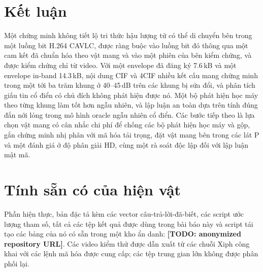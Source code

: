 \documentclass[journal]{IEEEtran}
\newcommand{\todo}[1]{\textbf{[TODO: #1]}}
\begin{document}
\section{Kết luận}
\label{sec:conclusion}

Một chứng minh không tiết lộ tri thức hậu lượng tử có thể di chuyển bên trong
một luồng bit H.264 CAVLC, được ràng buộc vào luồng bit đó thông qua một cam kết
đã chuẩn hóa theo vật mang và vào một phiên của bên kiểm chứng, và được kiểm
chứng chỉ từ video. Với một envelope đã đăng ký 7.6\,kB và một envelope in-band
14.3\,kB, nội dung CIF và 4CIF nhiều kết cấu mang chứng minh trong một tới ba
trăm khung ở 40--45\,dB trên các khung bị sửa đổi, và phân tích giấu tin cổ điển
có chủ đích không phát hiện được nó. Một bộ phát hiện học máy theo từng khung
làm tốt hơn ngẫu nhiên, và lập luận an toàn dựa trên tính đúng đắn nới lỏng
trong mô hình oracle ngẫu nhiên cổ điển. Các bước tiếp theo là lựa chọn vật mang
có cân nhắc chi phí để chống các bộ phát hiện học máy và gộp, gắn chứng minh
nhị phân với mã hóa tải trọng, đặt vật mang bên trong các lát P và một đánh giá
ở độ phân giải HD, cùng một rà soát độc lập đối với lập luận mật mã.

\section*{Tính sẵn có của hiện vật}
Phần hiện thực, bản đặc tả kèm các vector câu-trả-lời-đã-biết, các script ước
lượng tham số, tất cả các tệp kết quả được dùng trong bài báo này và script tái
tạo các bảng của nó có sẵn trong một kho ẩn danh: \todo{anonymized repository URL}.
Các video kiểm thử được dẫn xuất từ các chuỗi Xiph công khai với các lệnh mã hóa
được cung cấp; các tệp trung gian lớn không được phân phối lại.




\end{document}
